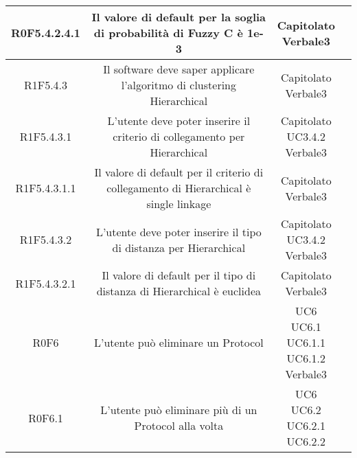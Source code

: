 \begin{center}
\begin{longtable}{|c|c|c|c|}
R0F5.4.2.4.1   & \parbox[t]{\larghezza}{Il valore di default per la soglia di probabilità di Fuzzy C\glossario{} è 1e-3}  & \parbox[t]{\dimFonti}{ Capitolato \\ Verbale3 \\} \\
\hline
R1F5.4.3   & \parbox[t]{\larghezza}{Il software deve saper applicare l'algoritmo di clustering\glossario{} Hierarchical\glossario{}}  & \parbox[t]{\dimFonti}{ Capitolato \\ Verbale3 \\} \\
\hline
R1F5.4.3.1   & \parbox[t]{\larghezza}{L'utente deve poter inserire il criterio di collegamento per Hierarchical\glossario{}}  & \parbox[t]{\dimFonti}{ Capitolato \\ UC3.4.2 \\ Verbale3 \\} \\
\hline
R1F5.4.3.1.1   & \parbox[t]{\larghezza}{Il valore di default per il criterio di collegamento di Hierarchical\glossario{} è single linkage}  & \parbox[t]{\dimFonti}{ Capitolato \\ Verbale3 \\} \\
\hline
R1F5.4.3.2   & \parbox[t]{\larghezza}{L'utente deve poter inserire il tipo di distanza per Hierarchical\glossario{}}  & \parbox[t]{\dimFonti}{ Capitolato \\ UC3.4.2 \\ Verbale3 \\} \\
\hline
R1F5.4.3.2.1   & \parbox[t]{\larghezza}{Il valore di default per il tipo di distanza di Hierarchical\glossario{} è euclidea}  & \parbox[t]{\dimFonti}{ Capitolato \\ Verbale3 \\} \\
\hline
R0F6   & \parbox[t]{\larghezza}{L'utente può eliminare un Protocol\glossario{}}  & \parbox[t]{\dimFonti}{ UC6 \\ UC6.1 \\ UC6.1.1 \\ UC6.1.2 \\ Verbale3 \\} \\
\hline
R0F6.1   & \parbox[t]{\larghezza}{L'utente può eliminare più di un Protocol\glossario{} alla volta}  & \parbox[t]{\dimFonti}{ UC6 \\ UC6.2 \\ UC6.2.1 \\ UC6.2.2 \\} \\

\end{longtable}
\end{center}
